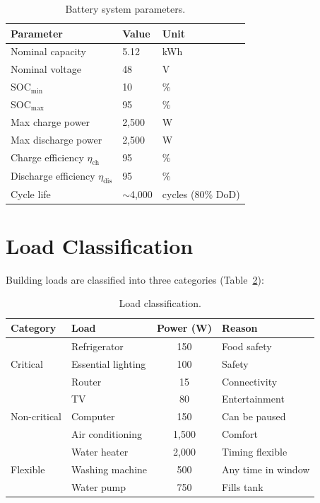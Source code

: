 \begin{table}[H]
\centering
\caption{Battery system parameters.}
\label{tab:battery}
\begin{tabular}{lll}
\toprule
\textbf{Parameter} & \textbf{Value} & \textbf{Unit} \\
\midrule
Nominal capacity & 5.12 & kWh \\
Nominal voltage & 48 & V \\
SOC$_{\min}$ & 10 & \% \\
SOC$_{\max}$ & 95 & \% \\
Max charge power & 2,500 & W \\
Max discharge power & 2,500 & W \\
Charge efficiency $\eta_{\text{ch}}$ & 95 & \% \\
Discharge efficiency $\eta_{\text{dis}}$ & 95 & \% \\
Cycle life & $\sim$4,000 & cycles (80\% DoD) \\
\bottomrule
\end{tabular}
\end{table}

\section{Load Classification}

Building loads are classified into three categories (Table~\ref{tab:loads}):

\begin{table}[H]
\centering
\caption{Load classification.}
\label{tab:loads}
\begin{tabularx}{\textwidth}{llcX}
\toprule
\textbf{Category} & \textbf{Load} & \textbf{Power (W)} & \textbf{Reason} \\
\midrule
\multirow{3}{*}{Critical} & Refrigerator & 150 & Food safety \\
 & Essential lighting & 100 & Safety \\
 & Router & 15 & Connectivity \\
\midrule
\multirow{3}{*}{Non-critical} & TV & 80 & Entertainment \\
 & Computer & 150 & Can be paused \\
 & Air conditioning & 1,500 & Comfort \\
\midrule
\multirow{3}{*}{Flexible} & Water heater & 2,000 & Timing flexible \\
 & Washing machine & 500 & Any time in window \\
 & Water pump & 750 & Fills tank \\
\bottomrule
\end{tabularx}
\end{table}
